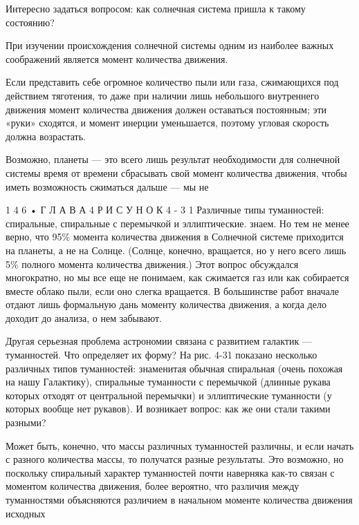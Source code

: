 \documentclass[10pt,oneside]{article}
\begin{document}
Интересно задаться вопросом: как солнечная система пришла к такому состоянию?\par

При изучении происхождения солнечной системы одним из наиболее важных соображений является момент количества движения.\par

Если представить себе огромное количество пыли или газа, сжимающихся под действием тяготения, то даже при наличии лишь небольшого внутреннего движения момент количества движения должен оставаться постоянным; эти «руки» сходятся, и момент инерции уменьшается, поэтому угловая скорость должна возрастать.\par

Возможно, планеты --- это всего лишь результат необходимости для солнечной системы время от времени сбрасывать свой момент количества движения, чтобы иметь возможность сжиматься дальше --- мы не\par

1 4 6 • Г Л А В А  4 Р И С У Н О К  4 - 3 1 Различные типы туманностей: спиральные, спиральные с перемычкой и эллиптические. знаем. Но тем не менее верно, что 95\% момента количества движения в Солнечной системе приходится на планеты, а не на Солнце. (Солнце, конечно, вращается, но у него всего лишь 5\% полного момента количества движения.) Этот вопрос обсуждался многократно, но мы все еще не понимаем, как сжимается газ или как собирается вместе облако пыли, если оно слегка вращается. В большинстве работ вначале отдают лишь формальную дань моменту количества движения, а когда дело доходит до анализа, о нем забывают.\par

Другая серьезная проблема астрономии связана с развитием галактик --- туманностей. Что определяет их форму? На рис. 4-31 показано несколько различных типов туманностей: знаменитая обычная спиральная (очень похожая на нашу Галактику), спиральные туманности с перемычкой (длинные рукава которых отходят от центральной перемычки) и эллиптические туманности (у которых вообще нет рукавов). И возникает вопрос: как же они стали такими разными?\par

Может быть, конечно, что массы различных туманностей различны, и если начать с разного количества массы, то получатся разные результаты. Это возможно, но поскольку спиральный характер туманностей почти наверняка как-то связан с моментом количества движения, более вероятно, что различия между туманностями объясняются различием в начальном моменте количества движения исходных\par
\end{document}
